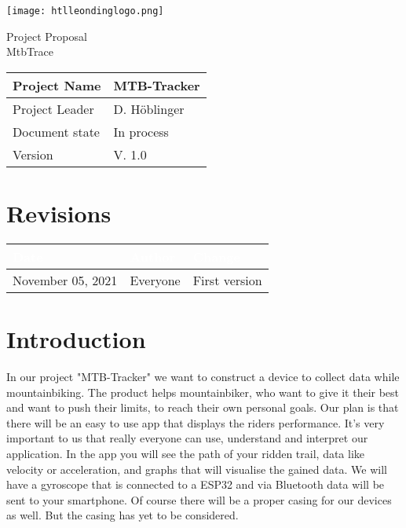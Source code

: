 \documentclass[12pt]{article}
\theoremstyle{definition}
\newcommand{\projectname}{MTB-Tracker}
\newcommand{\productname}{MtbTrace}
\newcommand{\projectleader}{D. Höblinger}
\newcommand{\documentstatus}{In process}
\newcommand{\version}{V. 1.0}
\begin{document}
\begin{titlepage}
\begin{flushright}
\texttt{[image: htlleondinglogo.png]}\\
\end{flushright}

\vspace{10em}

\begin{center}
{\Huge Project Proposal} \\[3em]
{\LARGE \productname} \\[3em]
\end{center}

\begin{flushleft}
\begin{tabular}{|l|l|}
\hline
Project Name & \projectname \\ \hline
Project Leader & \projectleader \\ \hline
Document state & \documentstatus \\ \hline
Version & \version \\ \hline
\end{tabular}
\end{flushleft}

\end{titlepage}
\section*{Revisions}
\begin{tabular}{|l|l|l|}
\hline
\cellcolor[gray]{0.5}\textcolor{white}{Date} & \cellcolor[gray]{0.5}\textcolor{white}{Author} & \cellcolor[gray]{0.5}\textcolor{white}{Change} \\ \hline
November 05, 2021&Everyone&First version \\ \hline
\end{tabular}
\pagebreak

\tableofcontents
\pagebreak

\section{Introduction}
In our project "MTB-Tracker" we want to construct a device to collect data while mountainbiking. The product helps mountainbiker, who want to give it their best and want to push their limits, to reach their own personal goals. Our plan is that there will be an easy to use app that displays the riders performance. It's very important to us that really everyone can use, understand and interpret our application. In the app you will see the path of your ridden trail, data like velocity or acceleration, and graphs that will visualise the gained data. We will have a gyroscope that is connected to a ESP32 and via Bluetooth data will be sent to your smartphone. Of course there will be a proper casing for our devices as well. But the casing has yet to be considered.
\pagebreak
\end{document}
